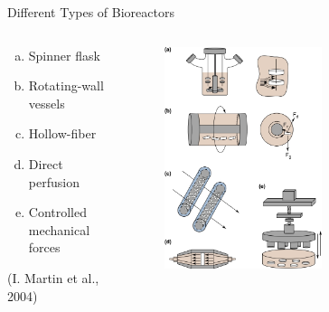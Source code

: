 \documentclass[11pt,t]{beamer}
\begin{document}
\begin{frame}[fragile]{Different Types of Bioreactors}  

	\begin{columns}[t]
		\begin{column}{.45\textwidth}
		\begin{enumerate}[a.]
		\item
		Spinner flask
		\item
		Rotating-wall vessels 
		\item
		 Hollow-fiber
		\item
		Direct perfusion
		\item		
		Controlled mechanical forces 
		\end{enumerate}
		
		\vspace{50pt}
		\footnotesize(I. Martin et al., 2004)
 
		\end{column}
		\begin{column}{.55\textwidth}
			\vspace{-30pt}
			\begin{figure}
			\centering
			\includegraphics[width=0.6\textwidth]{types}
			
			\end{figure}
		\end{column}
	\end{columns}	
		
\end{frame}
\end{document}
